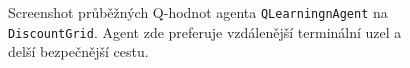 \begin{figure}[!htbp]
\begin{center}
  \caption{Screenshot průběžných Q-hodnot agenta \texttt{QLearningnAgent} na \texttt{DiscountGrid}. Agent zde preferuje vzdálenější terminální uzel a delší bezpečnější cestu.}
  \label{img:discountPolicyQ}
\end{center}
\end{figure}


